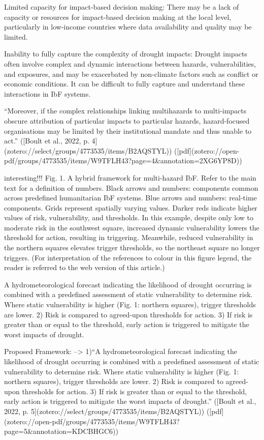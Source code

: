 {Limited capacity for impact-based decision making: There may be a lack of capacity or resources for impact-based decision making at the local level, particularly in low-income countries where data availability and quality may be limited.

Inability to fully capture the complexity of drought impacts: Drought impacts often involve complex and dynamic interactions between hazards, vulnerabilities, and exposures, and may be exacerbated by non-climate factors such as conflict or economic conditions. It can be difficult to fully capture and understand these interactions in IbF systems.

“Moreover, if the complex relationships linking multihazards to multi-impacts obscure attribution of particular impacts to particular hazards, hazard-focused organisations may be limited by their institutional mandate and thus unable to act.” ([Boult et al., 2022, p. 4](zotero://select/groups/4773535/items/B2AQSTYL)) ([pdf](zotero://open-pdf/groups/4773535/items/W9TFLH43?page=4&annotation=2XG6YP8D))

interesting!!! Fig. 1. A hybrid framework for multi-hazard IbF. Refer to the main text for a definition of numbers. Black arrows and numbers: components common across predefined humanitarian IbF systems. Blue arrows and numbers: real-time components. Grids represent spatially varying values. Darker reds indicate higher values of risk, vulnerability, and thresholds. In this example, despite only low to moderate risk in the southwest square, increased dynamic vulnerability lowers the threshold for action, resulting in triggering. Meanwhile, reduced vulnerability in the northern squares elevates trigger thresholds, so the northeast square no longer triggers. (For interpretation of the references to colour in this figure legend, the reader is referred to the web version of this article.)

A hydrometeorological forecast indicating the likelihood of drought occurring is combined with a predefined assessment of static vulnerability to determine risk. Where static vulnerability is higher (Fig. 1: northern squares), trigger thresholds are lower. 2) Risk is compared to agreed-upon thresholds for action. 3) If risk is greater than or equal to the threshold, early action is triggered to mitigate the worst impacts of drought.

Proposed Framework:
--> 1)“A hydrometeorological forecast indicating the likelihood of drought occurring is combined with a predefined assessment of static vulnerability to determine risk. Where static vulnerability is higher (Fig. 1: northern squares), trigger thresholds are lower.
2) Risk is compared to agreed-upon thresholds for action.
3) If risk is greater than or equal to the threshold, early action is triggered to mitigate the worst impacts of drought.” ([Boult et al., 2022, p. 5](zotero://select/groups/4773535/items/B2AQSTYL)) ([pdf](zotero://open-pdf/groups/4773535/items/W9TFLH43?page=5&annotation=KDCBHGC6))

}
